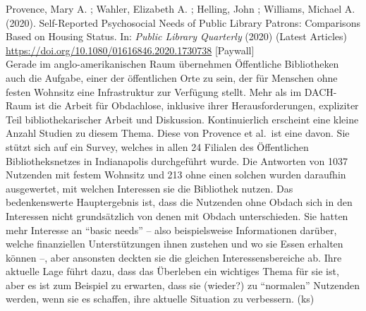 \documentclass[a4paper,
fontsize=11pt,
oneside,
numbers=noperiodatend,
parskip=half-,
bibliography=totoc,
final
]{scrartcl}
\begin{document}
Provence, Mary A. ; Wahler, Elizabeth A. ; Helling, John ; Williams,
Michael A. (2020). Self-Reported Psychosocial Needs of Public Library
Patrons: Comparisons Based on Housing Status. In: \emph{Public Library
Quarterly} (2020) (Latest Articles)
\url{https://doi.org/10.1080/01616846.2020.1730738} {[}Paywall{]}\\
Gerade im anglo-amerikanischen Raum übernehmen Öffentliche Bibliotheken
auch die Aufgabe, einer der öffentlichen Orte zu sein, der für Menschen
ohne festen Wohnsitz eine Infrastruktur zur Verfügung stellt. Mehr als
im DACH-Raum ist die Arbeit für Obdachlose, inklusive ihrer
Herausforderungen, expliziter Teil bibliothekarischer Arbeit und
Diskussion. Kontinuierlich erscheint eine kleine Anzahl Studien zu
diesem Thema. Diese von Provence et al.~ist eine davon. Sie stützt sich
auf ein Survey, welches in allen 24 Filialen des Öffentlichen
Bibliotheksnetzes in Indianapolis durchgeführt wurde. Die Antworten von
1037 Nutzenden mit festem Wohnsitz und 213 ohne einen solchen wurden
daraufhin ausgewertet, mit welchen Interessen sie die Bibliothek nutzen.
Das bedenkenswerte Hauptergebnis ist, dass die Nutzenden ohne Obdach
sich in den Interessen nicht grundsätzlich von denen mit Obdach
unterschieden. Sie hatten mehr Interesse an ``basic needs'' -- also
beispielsweise Informationen darüber, welche finanziellen
Unterstützungen ihnen zustehen und wo sie Essen erhalten können --, aber
ansonsten deckten sie die gleichen Interessensbereiche ab. Ihre aktuelle
Lage führt dazu, dass das Überleben ein wichtiges Thema für sie ist,
aber es ist zum Beispiel zu erwarten, dass sie (wieder?) zu ``normalen''
Nutzenden werden, wenn sie es schaffen, ihre aktuelle Situation zu
verbessern. (ks)
\end{document}
